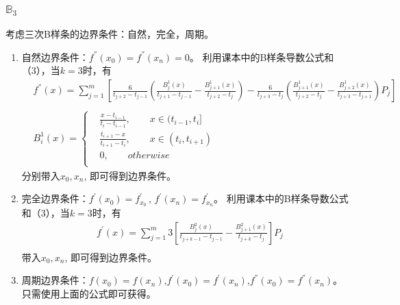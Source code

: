 \documentclass[UTF8]{ctexart}
\begin{document}
    \subsubsection*{\textbf{$\mathbb{B} _{3}$}}
    考虑三次B样条的边界条件：自然，完全，周期。
    
    \begin{enumerate}
        \item 自然边界条件：$f^{''}(x_{0}) = f^{''}(x_{n}) = 0$。
        利用课本中的B样条导数公式和（3），当$k=3$时，有
        \begin{align}
            &f^{''}(x) = \sum_{j = 1}^{m} \left[\frac{6}{t_{j+2} - t_{j-1}}
                        (\frac{B_{j}^{1}(x)}{t_{j+1}-t_{j-1}} - \frac{B_{j+1}^{1}(x)}{t_{j+2}-t_{j}})
                        - \frac{6}{t_{j+3}-t_{j}}
                        (\frac{B_{j+1}^{1}(x)}{t_{j+2}-t_{j}} - \frac{B_{j+2}^{1}(x)}{t_{j+3}-t_{j+1}})P_{j}\right] \\
            & \\
            &B_{i}^{1}(x) = \left\{
                        \begin{array}{rl}
                        &\frac{x - t_{i-1}}{t_{i} - t_{i-1}}, \qquad x \in (t_{i-1}, t_{i}] \\
                        &\frac{t_{i+1} - x}{t_{i+1} - t_{i}}, \qquad x \in (t_{i}, t_{i+1}) \\
                        &0, \qquad otherwise \\
                        \end{array}
                        \right.
        \end{align}
        分别带入$x_{0}, x_{n}$, 即可得到边界条件。

        \item 完全边界条件：$f^{'}(x_{0}) = f^{'}_{x_{0}}\, ,\, f^{'}(x_{n}) = f^{'}_{x_{n}}$。
        利用课本中的B样条导数公式和（3），当$k=3$时，有
        \begin{align}
            &f^{'}(x) = \sum_{j = 1}^{m} 3\left[\frac{B_{j}^{2}(x)}{t_{j+k-1} - t_{j-1}} 
                                                - \frac{B_{j+1}^{2}(x)}{t_{j+k} - t_{j}}\right]P_{j} \\
        \end{align}
        带入$x_{0}, x_{n}$, 即可得到边界条件。

        \item 周期边界条件：$f(x_{0}) = f(x_{n})$,$f^{'}(x_{0}) = f^{'}(x_{n})$,$f^{''}(x_{0}) = f^{''}(x_{n})$。
        只需使用上面的公式即可获得。
    \end{enumerate}
\end{document}
